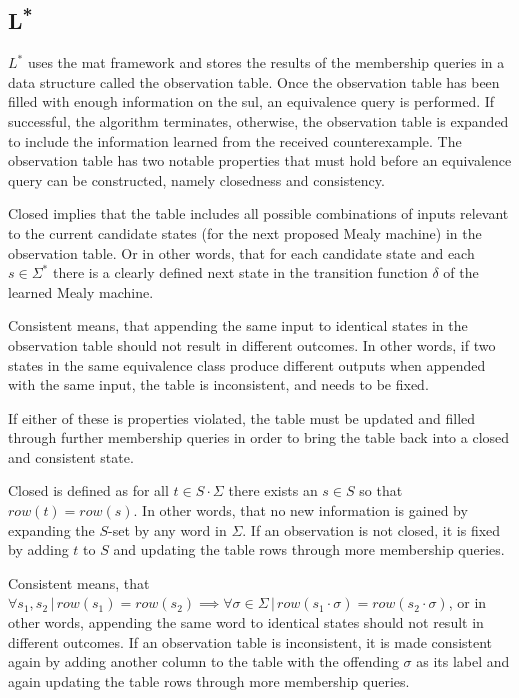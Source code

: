 \subsection{L\textsuperscript{*}}
$L^*$ uses the \ac{mat} framework and stores the results of the membership queries in a data structure called the observation table. Once the observation table has been filled with enough information on the \ac{sul}, an equivalence query is performed. If successful, the algorithm terminates, otherwise, the observation table is expanded to include the information learned from the received counterexample. The observation table has two notable properties that must hold before an equivalence query can be constructed, namely closedness and consistency. 

Closed implies that the table includes all possible combinations of inputs relevant to the current candidate states (for the next proposed Mealy machine) in the observation table. Or in other words, that for each candidate state and each $s \in \Sigma^*$ there is a clearly defined next state in the transition function $\delta$ of the learned Mealy machine.

Consistent means, that appending the same input to identical states in the observation table should not result in different outcomes. In other words, if two states in the same equivalence class produce different outputs when appended with the same input, the table is inconsistent, and needs to be fixed.

If either of these is properties violated, the table must be updated and filled through further membership queries in order to bring the table back into a closed and consistent state. 

\iffalse
Closed is defined as for all $t \in S \cdot \Sigma$ there exists an $s \in S$ so that $row(t) = row(s)$. In other words, that no new information is gained by expanding the $S$-set by any word in $\Sigma$. If an observation is not closed, it is fixed by adding $t$ to $S$ and updating the table rows through more membership queries. 

Consistent means, that $\forall s_1, s_2 \,|\, row(s_1) = row(s_2) \implies \forall \sigma \in \Sigma \,|\, row(s_1 \cdot \sigma) = row(s_2 \cdot \sigma)$, or in other words, appending the same word to identical states should not result in different outcomes. If an observation table is inconsistent, it is made consistent again by adding another column to the table with the offending $\sigma$ as its label and again updating the table rows through more membership queries. 


